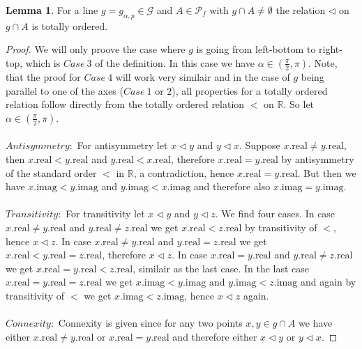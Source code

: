 \documentclass[12pt,a4paper]{scrartcl}
\numberwithin{equation}{subsection}
\newcommand{\1}{\mathbbm{1}}
\newcommand{\G}{\mathcal{G}}
\numberwithin{equation}{section}
\theoremstyle{definition}
\newtheorem{lemma}{Lemma}[subsection]
\begin{document}
\begin{lemma}
For a line $g=g_{\alpha,p}\in\G$ and $A\in \mathcal{P}_f$ with $g\cap A\neq \emptyset$ the relation $\triangleleft$ on $g\cap A$ is totally ordered. 
	\begin{proof}
		We will only proove the case where $g$ is going from left-bottom to right-top, which is $\mathit{Case}\ 3$ of the definition. In this case we have $\alpha\in (\frac{\pi}{2},\pi)$. Note, that the proof for $\mathit{Case\ }4$ will work very similair and in the case of $g$ being parallel to one of the axes ($\mathit{Case\ }1$ or $2$), all properties for a totally ordered relation follow directly from the totally ordered relation $<$ on $\mathbb{R}$. So let $\alpha\in (\frac{\pi}{2},\pi)$. \\
		\\
		$\mathit{Antisymmetry:}$ For antisymmetry let $x \triangleleft y$ and $y \triangleleft x$. Suppose $x.\text{real}\neq y.\text{real}$, then $x.\text{real} < y.\text{real}$ and $y.\text{real} < x.\text{real}$, therefore $x.\text{real} = y.\text{real}$ by antisymmetry of the standard order $<$ in $\mathbb{R}$, a contradiction, hence $x.\text{real} = y.\text{real}$. But then we have $x.\text{imag} < y.\text{imag}$ and $y.\text{imag} < x.\text{imag}$ and therefore also $x.\text{imag} = y.\text{imag}$. \\
		\\
		$\mathit{Transitivity:}$ For transitivity let $x \triangleleft y$ and $y \triangleleft z$. We find four cases. In case $x.\text{real} \neq y.\text{real}$ and $y.\text{real} \neq z.\text{real}$ we get $x.\text{real} < z.\text{real}$ by transitivity of $<$, hence $x \triangleleft z$. In case $x.\text{real}\neq y.\text{real}$ and $y.\text{real} = z.\text{real}$ we get $x.\text{real} < y.\text{real} = z.\text{real}$, therefore $x \triangleleft z$. In case $x.\text{real} = y.\text{real}$ and $y.\text{real} \neq z.\text{real}$ we get $x.\text{real} = y.\text{real} < z.\text{real}$, similair as the last case. In the last case $x.\text{real} = y.\text{real} = z.\text{real}$ we get $x.\text{imag} < y.\text{imag}$ and $y.\text{imag} < z.\text{imag}$ and again by transitivity of $<$ we get $x.\text{imag} < z.\text{imag}$, hence $x \triangleleft z$ again. \\
		\\
		$\mathit{Connexity:}$ Connexity is given since for any two points $x,y\in g\cap A$ we have either $x.\text{real} \neq y.\text{real}$ or $x.\text{real} = y.\text{real}$ and therefore either $x\triangleleft y$ or $y\triangleleft x$.
	 
	\end{proof}
\end{lemma}
\end{document}
